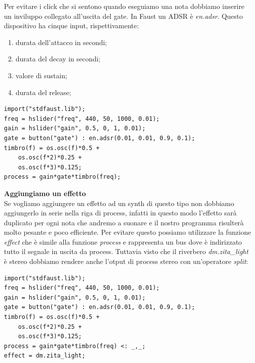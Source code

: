 \documentclass[11pt]{article}
\begin{document}
\begin{multicols*}{2}
Per evitare i click che si sentono quando eseguiamo una nota dobbiamo inserire un inviluppo collegato all'uscita del gate. In Faust un ADSR è \textit{en.adsr}. Questo dispositivo ha cinque input, rispettivamente:

\begin{enumerate}
\item durata dell'attacco in secondi; 
\item durata del decay in secondi;
\item valore di sustain;
\item durata del release;
\end{enumerate}

\begin{Verbatim}[fontsize=\footnotesize]
import("stdfaust.lib");
freq = hslider("freq", 440, 50, 1000, 0.01);
gain = hslider("gain", 0.5, 0, 1, 0.01);
gate = button("gate") : en.adsr(0.01, 0.01, 0.9, 0.1);
timbro(f) = os.osc(f)*0.5 + 
    os.osc(f*2)*0.25 + 
    os.osc(f*3)*0.125;
process = gain*gate*timbro(freq);
\end{Verbatim}

\textbf{Aggiungiamo un effetto}\\

Se vogliamo aggiungere un effetto ad un synth di questo tipo non dobbiamo aggiungerlo in serie nella riga di process, infatti in questo modo l'effetto sarà duplicato per ogni nota che andremo a suonare e il nostro programma risulterà molto pesante e poco efficiente. Per evitare questo possiamo utilizzare la funzione \textit{effect} che è simile alla funzione \textit{process} e rappresenta un bus dove è indirizzato tutto il segnale in uscita da process. Tuttavia visto che il riverbero \textit{dm.zita\_light} è stereo dobbiamo rendere anche l'otput di process stereo con un'operatore \textit{split}:

\begin{Verbatim}[fontsize=\footnotesize]
import("stdfaust.lib");
freq = hslider("freq", 440, 50, 1000, 0.01);
gain = hslider("gain", 0.5, 0, 1, 0.01);
gate = button("gate") : en.adsr(0.01, 0.01, 0.9, 0.1);
timbro(f) = os.osc(f)*0.5 + 
    os.osc(f*2)*0.25 + 
    os.osc(f*3)*0.125;
process = gain*gate*timbro(freq) <: _,_;
effect = dm.zita_light;
\end{Verbatim}


\end{multicols*}
\end{document}
